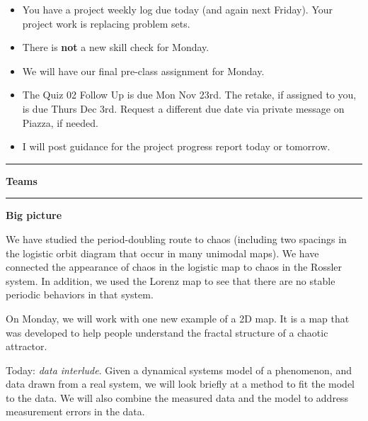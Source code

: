 \documentclass[12pt,letterpaper,noanswers]{exam}
\begin{document}
 \pdfpageheight 11in 
  \pdfpagewidth 8.5in

\noindent 




\begin{itemize}
\itemsep0em
\item You have a project weekly log due today (and again next Friday).  Your project work is replacing problem sets.
\item There is \textbf{not} a new skill check for Monday.
\item We will have our final pre-class assignment for Monday.
\item The Quiz 02 Follow Up is due Mon Nov 23rd.  The retake, if assigned to you, is due Thurs Dec 3rd.  Request a different due date via private message on Piazza, if needed.
\item I will post guidance for the project progress report today or tomorrow.
\end{itemize}

\hrule
\vspace{0.2cm}



\noindent\textbf{Teams}



\vspace{0.2cm}

\hrule
\vspace{0.2cm}


\noindent\textbf{Big picture}

We have studied the period-doubling route to chaos (including two spacings in the logistic orbit diagram that occur in many unimodal maps).  We have connected the appearance of chaos in the logistic map to chaos in the Rossler system.  In addition, we used the Lorenz map to see that there are no stable periodic behaviors in that system.

On Monday, we will work with one new example of a 2D map.  It is a map that was developed to help people understand the fractal structure of a chaotic attractor.

Today: \emph{data interlude}.  Given a dynamical systems model of a phenomenon, and data drawn from a real system, we will look briefly at a method to fit the model to the data.  We will also combine the measured data and the model to address measurement errors in the data.
\end{document}
